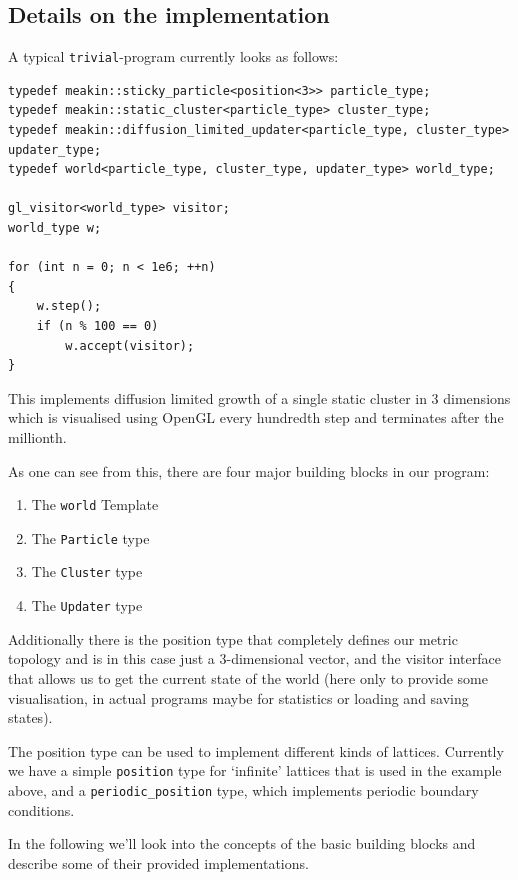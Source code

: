 \documentclass[twocolumn, 10pt]{scrartcl}
\begin{document}
        \subsection{Details on the implementation}
            A typical \lstinline'trivial'-program currently looks as follows:
            {\scriptsize
            \begin{lstlisting}
typedef meakin::sticky_particle<position<3>> particle_type;
typedef meakin::static_cluster<particle_type> cluster_type;
typedef meakin::diffusion_limited_updater<particle_type, cluster_type> updater_type;
typedef world<particle_type, cluster_type, updater_type> world_type;

gl_visitor<world_type> visitor;
world_type w;

for (int n = 0; n < 1e6; ++n)
{
    w.step();
    if (n % 100 == 0)
        w.accept(visitor);
}
            \end{lstlisting}
            }
            This implements diffusion limited growth of a single static cluster in 3 dimensions which is visualised
            using OpenGL every hundredth step and terminates after the millionth.

            As one can see from this, there are four major building blocks in our program:
            \begin{enumerate}
                \item The \lstinline'world' Template
                \item The \lstinline'Particle' type
                \item The \lstinline'Cluster' type
                \item The \lstinline'Updater' type
            \end{enumerate}
            Additionally there is the position type that completely defines our metric topology and is in this case just
            a 3-dimensional vector, and the visitor interface that allows us to get the current state of the world (here
            only to provide some visualisation, in actual programs maybe for statistics or loading and saving states).

            The position type can be used to implement different kinds of lattices. Currently we have a simple
            \lstinline'position' type for `infinite' lattices that is used in the example above, and a
            \lstinline'periodic_position' type, which implements periodic boundary conditions.

            In the following we'll look into the concepts of the basic building blocks and describe some of their
            provided implementations.
\end{document}
